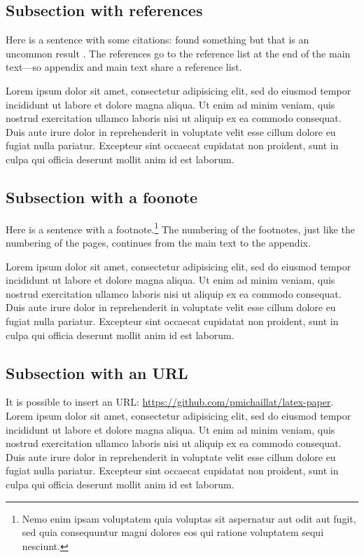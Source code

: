 \documentclass[letterpaper,12pt,leqno]{article}
\begin{document}
\subsection{Subsection with references}\label{a:subappendix}

Here is a sentence with some citations: \citet{MS19,MS21b} found something but that is an uncommon result \citep{M12,M14}. The references go to the reference list at the end of the main text---so appendix and main text share a reference list.

Lorem ipsum dolor sit amet, consectetur adipisicing elit, sed do eiusmod
tempor incididunt ut labore et dolore magna aliqua. Ut enim ad minim veniam,
quis nostrud exercitation ullamco laboris nisi ut aliquip ex ea commodo
consequat. Duis aute irure dolor in reprehenderit in voluptate velit esse
cillum dolore eu fugiat nulla pariatur. Excepteur sint occaecat cupidatat non
proident, sunt in culpa qui officia deserunt mollit anim id est laborum.

\subsection{Subsection with a foonote}

Here is a sentence with a footnote.\footnote{Nemo enim ipsam voluptatem quia voluptas sit aspernatur aut odit aut fugit, sed quia consequuntur magni dolores eos qui ratione voluptatem sequi nesciunt.} The numbering of the footnotes, just like the numbering of the pages, continues from the main text to the appendix.

Lorem ipsum dolor sit amet, consectetur adipisicing elit, sed do eiusmod tempor incididunt ut labore et dolore magna aliqua. Ut enim ad minim veniam,
quis nostrud exercitation ullamco laboris nisi ut aliquip ex ea commodo
consequat. Duis aute irure dolor in reprehenderit in voluptate velit esse
cillum dolore eu fugiat nulla pariatur. Excepteur sint occaecat cupidatat non
proident, sunt in culpa qui officia deserunt mollit anim id est laborum.

\subsection{Subsection with an URL}

It is possible to insert an URL: \url{https://github.com/pmichaillat/latex-paper}. Lorem ipsum dolor sit amet, consectetur adipisicing elit, sed do eiusmod
tempor incididunt ut labore et dolore magna aliqua. Ut enim ad minim veniam,
quis nostrud exercitation ullamco laboris nisi ut aliquip ex ea commodo
consequat. Duis aute irure dolor in reprehenderit in voluptate velit esse
cillum dolore eu fugiat nulla pariatur. Excepteur sint occaecat cupidatat non
proident, sunt in culpa qui officia deserunt mollit anim id est laborum.
\end{document}

